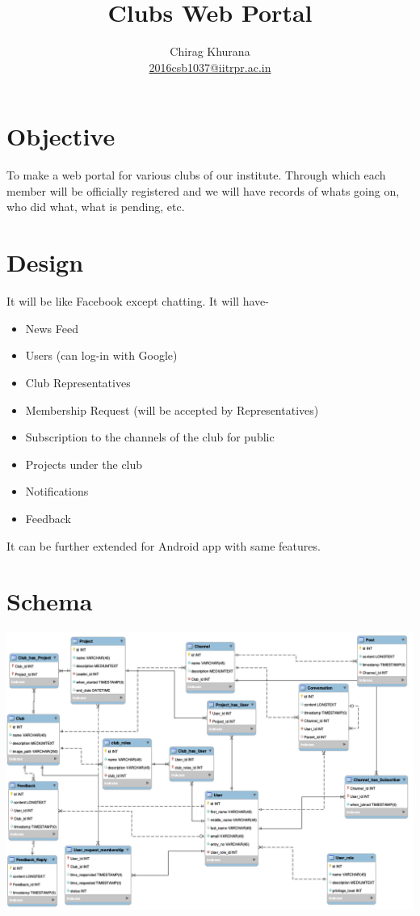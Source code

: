 \documentclass[journal]{IEEEtran}
\begin{document}
\onecolumn
\title{Clubs Web Portal}

\author{

Chirag Khurana\\
\href{mailto:2016csb1037@iitrpr.ac.in}{2016csb1037@iitrpr.ac.in}

}
\maketitle
\section{Objective}
To make a web portal for various clubs of our institute. Through which each member will be officially registered and we will have records of whats going on, who did what, what is pending, etc.

\section{Design}
It will be like Facebook except chatting. It will have-
\begin{itemize}
\item News Feed
\item Users (can log-in with Google)
\item Club Representatives
\item Membership Request (will be accepted by Representatives)
\item Subscription to the channels of the club for public
\item Projects under the club
\item Notifications
\item Feedback
\end{itemize}
It can be further extended for Android app with same features.

\section{Schema}
\centering
\includegraphics[width=1\linewidth]{schema.png}
\end{document}
